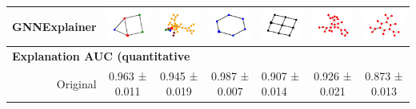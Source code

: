 \begin{table}[h!]
{\begin{tabular}{rcccccc}
GNNExplainer &  \includegraphics[width=.1\linewidth]{../openreview/imgs/simplification/syn1_gnn.png}
& \includegraphics[width=.1\linewidth]{../openreview/imgs/simplification/syn2_gnn.png} & \includegraphics[width=.1\linewidth]{../openreview/imgs/simplification/syn3_gnn.png} & \multicolumn{1}{l|}{\includegraphics[width=.1\linewidth]{../openreview/imgs/simplification/syn4_gnn.png}} & \includegraphics[width=.1\linewidth]{../openreview/imgs/simplification/ba_gnn.png} & \includegraphics[width=.1\linewidth]{../openreview/imgs/simplification/mutag_gnn.png} \\\hline
\multicolumn{7}{l}{\textbf{Explanation AUC (quantitative}} \\ \hline
Original & 0.963 ± 0.011 & 0.945 ± 0.019 & 0.987 ± 0.007 & \multicolumn{1}{l|}{0.907 ± 0.014} & 0.926 ± 0.021 & 0.873 ± 0.013 \\ 

\end{tabular}}
\end{table}
